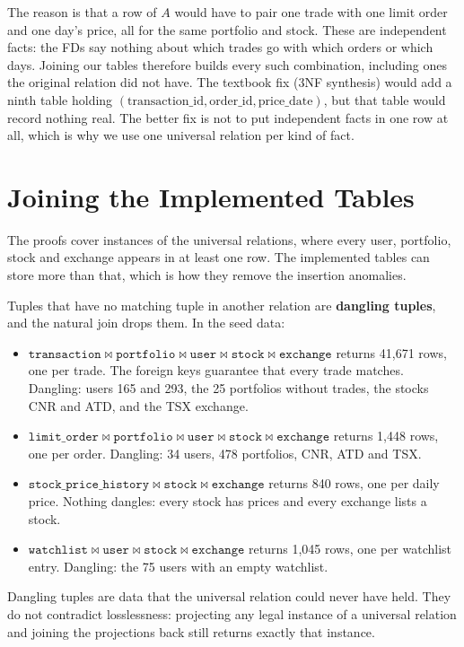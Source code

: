 \documentclass{article}
\newcommand{\at}[1]{\text{#1}}
\begin{document}
The reason is that a row of $A$ would have to pair one trade with one limit order and one day's price, all for the same portfolio and stock. These are independent facts: the FDs say nothing about which trades go with which orders or which days. Joining our tables therefore builds every such combination, including ones the original relation did not have. The textbook fix (3NF synthesis) would add a ninth table holding $(\at{transaction\_id}, \at{order\_id}, \at{price\_date})$, but that table would record nothing real. The better fix is not to put independent facts in one row at all, which is why we use one universal relation per kind of fact.

\section{Joining the Implemented Tables}

The proofs cover instances of the universal relations, where every user, portfolio, stock and exchange appears in at least one row. The implemented tables can store more than that, which is how they remove the insertion anomalies.

Tuples that have no matching tuple in another relation are \textbf{dangling tuples}, and the natural join drops them. In the seed data:
\begin{itemize}[leftmargin=*]
  \item $\texttt{transaction} \bowtie \texttt{portfolio} \bowtie \texttt{user} \bowtie \texttt{stock} \bowtie \texttt{exchange}$ returns 41{,}671 rows, one per trade. The foreign keys guarantee that every trade matches. Dangling: users 165 and 293, the 25 portfolios without trades, the stocks CNR and ATD, and the TSX exchange.
  \item $\texttt{limit\_order} \bowtie \texttt{portfolio} \bowtie \texttt{user} \bowtie \texttt{stock} \bowtie \texttt{exchange}$ returns 1{,}448 rows, one per order. Dangling: 34 users, 478 portfolios, CNR, ATD and TSX.
  \item $\texttt{stock\_price\_history} \bowtie \texttt{stock} \bowtie \texttt{exchange}$ returns 840 rows, one per daily price. Nothing dangles: every stock has prices and every exchange lists a stock.
  \item $\texttt{watchlist} \bowtie \texttt{user} \bowtie \texttt{stock} \bowtie \texttt{exchange}$ returns 1{,}045 rows, one per watchlist entry. Dangling: the 75 users with an empty watchlist.
\end{itemize}
Dangling tuples are data that the universal relation could never have held. They do not contradict losslessness: projecting any legal instance of a universal relation and joining the projections back still returns exactly that instance.
\end{document}
